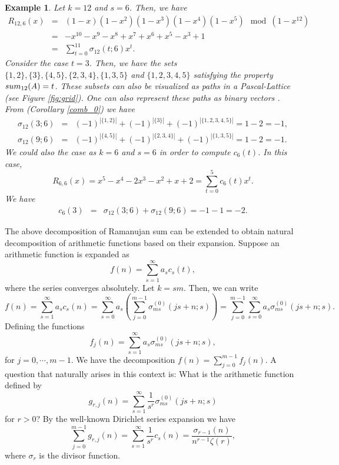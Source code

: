 \documentclass[12pt]{article}
\newtheorem{exmp}{Example}[subsection]%
\begin{document}
\begin{exmp} 
Let $k=12$ and $s=6$. Then, we have 
\begin{eqnarray}
\nonumber R_{12,6}(x)&=&(1-x)(1-x^2)(1-x^3)(1-x^4)(1-x^5)\mod (1-x^{12})\\   
&=& -x^{10} - x^9 - x^8 + x^7 + x^6 + x^5 - x^3 + 1 \\ 
\nonumber &=& \sum_{t=0}^{11} \sigma_{12}(t;6)x^{t}.\label{exmp_7}
\end{eqnarray}
Consider the case $t=3$. Then, we have the sets $\{1,2\}, \{3\},\{4,5\}, \{2,3,4\}, \{1,3,5\}$ and $\{1,2,3,4,5\}$ satisfying the property $\textnormal{sum}_{12}(A)=t$. These subsets can also be visualized as paths in a Pascal-Lattice (see Figure \ref{fig:grid}). One can also represent these paths as binary vectors \cite{uk2}. From (Corollary \ref{comb_0}) we have
\begin{eqnarray}
\sigma_{12}(3;6)&=&(-1)^{|\{1,2\}|}+(-1)^{|\{3\}|} + (-1)^{|\{1,2,3,4,5\}|}= 1-2 = -1,\label{eq_1}\\
\sigma_{12}(9;6)&=&(-1)^{|\{4,5\}|}+(-1)^{|\{2,3,4\}|}+(-1)^{|\{1,3,5\}|} =  1-2 = -1.\label{eq_2}
\end{eqnarray}
We could also the case as $k=6$ and $s=6$ in order to compute $c_{6}(t)$. In this case, 
$$
R_{6,6}(x)= x^5 - x^4 - 2x^3 - x^2 + x + 2=\sum^{5}_{t=0}c_{6}(t)x^{t}.
$$
We have 
\begin{eqnarray}
\nonumber c_{6}(3) &=& \sigma_{12}(3;6)+\sigma_{12}(9;6) = -1-1 = -2.
\end{eqnarray}

\end{exmp}

The above decomposition of Ramanujan sum can be extended to obtain natural decomposition of arithmetic functions based on their expansion. Suppose an arithmetic function is expanded as 
$$
f(n)=\sum_{s=1}^{\infty} a_{s} c_{s}(t),
$$
where the series converges absolutely. Let $k=sm$. Then, we can write 
$$
f(n)=\sum_{s=1}^{\infty} a_{s} c_{s}(n)=\sum_{s=0}^{\infty}a_{s}\left(\sum_{j=0}^{m-1}\sigma_{ms}^{(0)}(js+n;s)\right)=\sum_{j=0}^{m-1}\sum_{s=0}^{\infty}a_{s}\sigma_{ms}^{(0)}(js+n;s).
$$
Defining the functions 
$$
f_{j}(n)=\sum_{s=1}^{\infty}a_{s}\sigma_{ms}^{(0)}(js+n;s),
$$
for $j=0,\cdots, m-1$. We have the decomposition $f(n)=\sum^{m-1}_{j=0}f_{j}(n).$ A question that naturally arises in this context is: What is the arithmetic function defined by  
$$
g_{r,j}(n)=\sum_{s=1}^{\infty}\frac{1}{s^{r}}\sigma_{ms}^{(0)}(js+n;s)
$$
for $r >0$? By the well-known Dirichlet series expansion we have
$$
\sum_{j=0}^{m-1} g_{r,j}(n) = \sum_{s=1}^{\infty}\frac{1}{s^{r}}c_{s}(n)=\frac{\sigma_{r-1}(n)}{n^{r-1}\zeta(r)},
$$
where $\sigma_{r}$ is the divisor function. 
\end{document}
